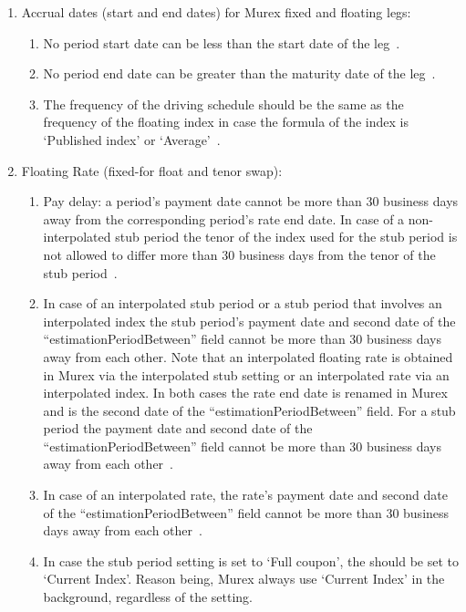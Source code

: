 \documentclass[]{pmv_report} %
\begin{document}
\begin{enumerate}
  \item Accrual dates (start and end dates) for Murex fixed and floating legs:
      \begin{enumerate}
         \item No period start date can be less than the start date of the leg~\cite{MxSettings.IRS}.
         \item No period end date can be greater than the maturity date of the leg~\cite{MxSettings.IRS}.
         \item The frequency of the driving schedule should be the same as the frequency of the floating index in case the formula of the index is `Published index' or `Average'~\cite{MxSettings.IRS}.
      \end{enumerate}
  \item Floating Rate (fixed-for float and tenor swap):
    \begin{enumerate}
        \item Pay delay: a period's payment date cannot be more than 30 business days away from the corresponding period's rate end date.
        In case of a non-interpolated stub period the tenor of the index used for the stub period is not allowed to differ more than 30 business days from the tenor of the stub period~\cite{MxSettings.IRS}.
        \item In case of an interpolated stub period or a stub period that involves an interpolated index the stub period's payment date and second date of the ``estimationPeriodBetween'' field cannot be more than 30 business days away from each other.
        Note that an interpolated floating rate is obtained in Murex via the interpolated stub setting or an interpolated rate via an interpolated index.
            In both cases the rate end date is renamed in Murex and is the second date of the ``estimationPeriodBetween'' field.
            For a stub period the payment date and second date of the ``estimationPeriodBetween'' field cannot be more than 30 business days away from each other~\cite{MxSettings.IRS}.
         \item In case of an interpolated rate, the rate's payment date and second date of the ``estimationPeriodBetween'' field cannot be more than 30 business days away from each other~\cite{MxSettings.IRS}.
         \item In case the stub period  setting is set to `Full coupon', the  should be set to `Current Index'.
         Reason being, Murex always use `Current Index' in the background, regardless of the  setting.

\end{enumerate}
\end{enumerate}
\end{document}
